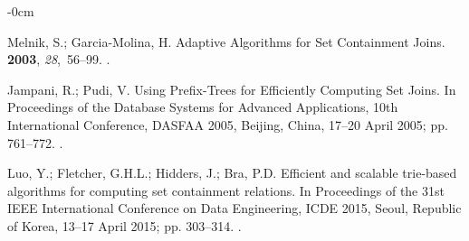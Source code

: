 \documentclass[algorithms,article,accept,pdftex,moreauthors]{Definitions/mdpi}
\begin{document}
\begin{adjustwidth}{-\extralength}{0cm}
\begin{thebibliography}{999}
Melnik, S.; Garcia-Molina, H.
\newblock Adaptive Algorithms for Set Containment Joins.
 {\bf 2003}, {\em 28},~56--99.
.

Jampani, R.; Pudi, V.
\newblock Using Prefix-Trees for Efficiently Computing Set Joins.
\newblock In Proceedings of the Database Systems for Advanced Applications,
  10th International Conference, {DASFAA} 2005, Beijing, China,  17--20 April
  2005; pp. 761--772.
.

Luo, Y.; Fletcher, G.H.L.; Hidders, J.; Bra, P.D.
\newblock Efficient and scalable trie-based algorithms for computing set
  containment relations.
\newblock In Proceedings of the 31st {IEEE} International Conference on Data
  Engineering, {ICDE} 2015, Seoul, Republic of Korea,  13--17 April 2015; pp.
  303--314.
.

\end{thebibliography}

\PublishersNote{}
%
%
\end{adjustwidth}
\end{document}
